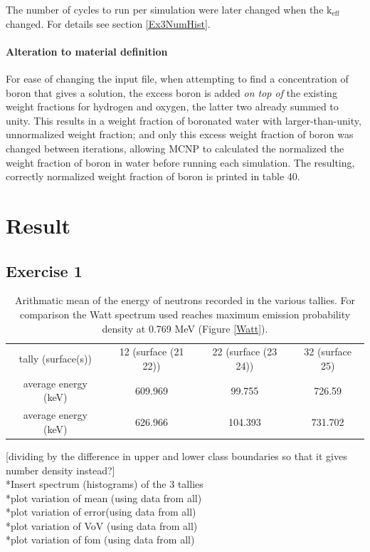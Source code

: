 \documentclass[a4paper, 12pt]{article}
\begin{document}
The number of cycles to run per simulation were later changed when the $\text{k}_{\text{eff}}$ changed. For details see section \ref{Ex3NumHist}.

\paragraph{Alteration to material definition\indent} For ease of changing the input file, when attempting to find a concentration of boron that gives a solution, the excess boron is added \emph{on top of} the existing weight fractions for hydrogen and oxygen, the latter two already summed to unity. This results in a weight fraction of boronated water with larger-than-unity, unnormalized weight fraction; and only this excess weight fraction of boron was changed between iterations, allowing MCNP to calculated the normalized the weight fraction of boron in water before running each simulation. The resulting, correctly normalized weight fraction of boron is printed in table 40.

\section{Result}
\subsection{Exercise 1}
\begin{table}[H]
	\centering
	\begin{tabular}{cccc}
		tally (surface(s)) & 12 (surface (21 22)) & 22 (surface (23 24)) & 32 (surface 25)	\\
		average energy (keV)  &609.969 & 99.755  & 726.59 \\
		average energy (keV)  &626.966 & 104.393 & 731.702
	\end{tabular}
	\caption{Arithmatic mean of the energy of neutrons recorded in the various tallies.
	For comparison the Watt spectrum used reaches maximum emission probability density at 0.769 MeV (Figure \ref{Watt}).
	}\label{Ex1meanE}
\end{table}
[dividing by the difference in upper and lower class boundaries so that it gives number density instead?]
\\*Insert spectrum (histograms) of the 3 tallies
\\*plot variation of mean (using data from all)
\\*plot variation of error(using data from all)
\\*plot variation of VoV (using data from all)
\\*plot variation of fom (using data from all)
\end{document}
